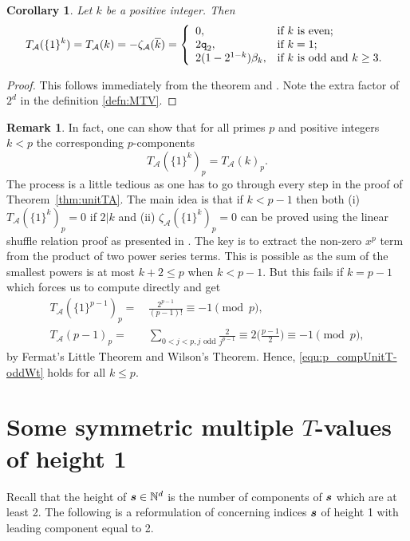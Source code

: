 \documentclass{article}
\newcommand{\bfs}{{\boldsymbol{\sl{s}}}}
\newcommand{\calA}{\mathcal{A}}
\newcommand{\N}{\mathbb{N}}
\newcommand{\ol}{\overline}
\theoremstyle{plain}
\newtheorem{cor}[thm]{Corollary}
\theoremstyle{definition}
\newtheorem{rem}[thm]{Remark}
\begin{document}
\begin{cor}\label{cor:unitT-oddWt}
Let $k$ be a positive integer. Then
\begin{equation*}
T_\calA(\{1\}^k)=T_\calA(k)=-\zeta_\calA(\ol{k})=
\left\{
  \begin{array}{ll}
    0, & \hbox{if $k$ is even;} \\
    2\texttt{q}_2, & \hbox{if $k=1$;} \\
    2(1-2^{1-k})\beta_k, & \hbox{if $k$ is odd and $k\ge 3$.}
  \end{array}
\right.
\end{equation*}
\end{cor}
\begin{proof}
This follows immediately from the theorem and \cite[(12)]{Zhao2023Dec}. Note the extra factor of $2^d$ in the definition \eqref{defn:MTV}.
\end{proof}


\begin{rem}\label{rem:unitT-oddWt}
In fact, one can show that for all primes $p$ and positive integers $k<p$ the corresponding $p$-components
\begin{equation}\label{equ:p_compUnitT-oddWt}
T_\calA(\{1\}^k)_p=T_\calA(k)_p.
\end{equation}
The process is a little tedious as one has to go through every step in the proof of Theorem~\ref{thm:unitTA}.
The main idea is that if $k<p-1$ then both (i) $T_\calA\left(\{1\}^k\right)_p=0$ if $2|k$ and (ii) $\zeta_\calA\left(\{1\}^k\right)_p=0$ can be proved using the linear shuffle relation proof as presented in \cite[(12)]{Zhao2023Dec}. The key is  to extract the non-zero $x^p$ term from the product of two power series terms. This is possible as the sum of the smallest powers is at most $k+2\le p$ when $k<p-1$. But this fails if $k=p-1$ which forces us to compute directly and get
\begin{align*}
T_\calA(\{1\}^{p-1})_p=&\, \frac{2^{p-1}}{(p-1)!}\equiv -1 \pmod{p},\\
T_\calA(p-1)_p=&\,\sum_{0< j<p,   j \text{ odd}} \frac{2}{j^{p-1}}\equiv 2\Big(\frac{p-1}{2}\Big)\equiv -1 \pmod{p},
\end{align*}
by Fermat's Little Theorem and Wilson's Theorem. Hence, \eqref{equ:p_compUnitT-oddWt} holds for all $k\le p$.
\end{rem}



\section{Some symmetric multiple $T$-values of height 1}
Recall that the height of $\bfs\in\N^d$ is the number of components of $\bfs$ which are at least 2. The following is a reformulation of \cite[Conj. 2 ]{Zhao2023Dec} concerning indices $\bfs$ of height 1 with leading component equal to 2.
\end{document}

